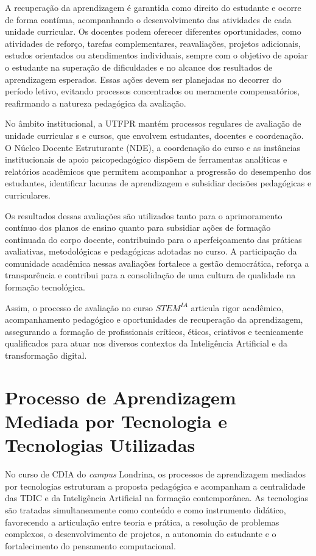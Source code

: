 A recuperação da aprendizagem é garantida como direito do estudante e ocorre de forma contínua, acompanhando o desenvolvimento das atividades de cada unidade curricular. Os docentes podem oferecer diferentes oportunidades, como atividades de reforço, tarefas complementares, reavaliações, projetos adicionais, estudos orientados ou atendimentos individuais, sempre com o objetivo de apoiar o estudante na superação de dificuldades e no alcance dos resultados de aprendizagem esperados. Essas ações devem ser planejadas no decorrer do período letivo, evitando processos concentrados ou meramente compensatórios, reafirmando a natureza pedagógica da avaliação.

No âmbito institucional, a UTFPR mantém processos regulares de avaliação de unidade curricular s e cursos, que envolvem estudantes, docentes e coordenação. O Núcleo Docente Estruturante (NDE), a coordenação do curso e as instâncias institucionais de apoio psicopedagógico dispõem de ferramentas analíticas e relatórios acadêmicos que permitem acompanhar a progressão do desempenho dos estudantes, identificar lacunas de aprendizagem e subsidiar decisões pedagógicas e curriculares.

Os resultados dessas avaliações são utilizados tanto para o aprimoramento contínuo dos planos de ensino quanto para subsidiar ações de formação continuada do corpo docente, contribuindo para o aperfeiçoamento das práticas avaliativas, metodológicas e pedagógicas adotadas no curso. A participação da comunidade acadêmica nessas avaliações fortalece a gestão democrática, reforça a transparência e contribui para a consolidação de uma cultura de qualidade na formação tecnológica.

Assim, o processo de avaliação no curso $STEM^{IA}$ articula rigor acadêmico, acompanhamento pedagógico e oportunidades de recuperação da aprendizagem, assegurando a formação de profissionais críticos, éticos, criativos e tecnicamente qualificados para atuar nos diversos contextos da Inteligência Artificial e da transformação digital.

\section{Processo de Aprendizagem Mediada por Tecnologia e Tecnologias Utilizadas}

No curso de CDIA do \textit{campus} Londrina, os processos de aprendizagem mediados por tecnologias estruturam a proposta pedagógica e acompanham a centralidade das TDIC e da Inteligência Artificial na formação contemporânea. As tecnologias são tratadas simultaneamente como conteúdo e como instrumento didático, favorecendo a articulação entre teoria e prática, a resolução de problemas complexos, o desenvolvimento de projetos, a autonomia do estudante e o fortalecimento do pensamento computacional.

